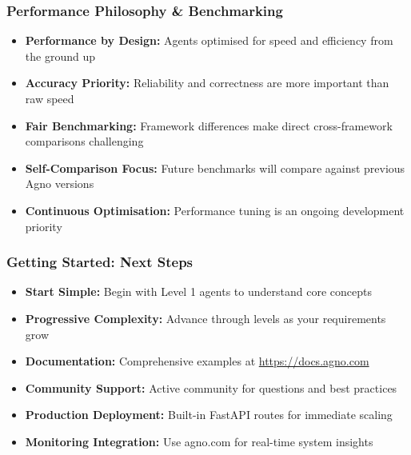 \begin{frame}[fragile]\frametitle{Performance Philosophy \& Benchmarking}
      \begin{itemize}
        \item \textbf{Performance by Design:} Agents optimised for speed and efficiency from the ground up
        \item \textbf{Accuracy Priority:} Reliability and correctness are more important than raw speed
        \item \textbf{Fair Benchmarking:} Framework differences make direct cross-framework comparisons challenging
        \item \textbf{Self-Comparison Focus:} Future benchmarks will compare against previous Agno versions
        \item \textbf{Continuous Optimisation:} Performance tuning is an ongoing development priority
      \end{itemize}
\end{frame}

\begin{frame}[fragile]\frametitle{Getting Started: Next Steps}
      \begin{itemize}
        \item \textbf{Start Simple:} Begin with Level 1 agents to understand core concepts
        \item \textbf{Progressive Complexity:} Advance through levels as your requirements grow
        \item \textbf{Documentation:} Comprehensive examples at \url{https://docs.agno.com}
        \item \textbf{Community Support:} Active community for questions and best practices
        \item \textbf{Production Deployment:} Built-in FastAPI routes for immediate scaling
        \item \textbf{Monitoring Integration:} Use agno.com for real-time system insights
      \end{itemize}
\end{frame}

